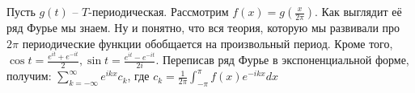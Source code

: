 \documentclass[document.tex]{subfiles}
\begin{document}
Пусть $g(t)$ -- $T$-периодическая. Рассмотрим $f(x) = g(\frac{x}{2 \pi})$. Как выглядит её ряд Фурье мы знаем. Ну и
понятно, что вся теория, которую мы развивали про $2 \pi$ периодические функции обобщается на произвольный период. Кроме
того, $\cos t = \frac{e^{it} + e^{-it}}{2}, \sin t = \frac{e^{it} - e^{-it}}{2i}$. Переписав ряд Фурье в
экспоненциальной форме, получим: $\sum_{k = -\infty}^{\infty}e^{ikx}c_k$, где $c_k = \frac{1}{2\pi}\int_{-\pi}^{\pi}f(x) e^{-ikx}dx$
\end{document}
